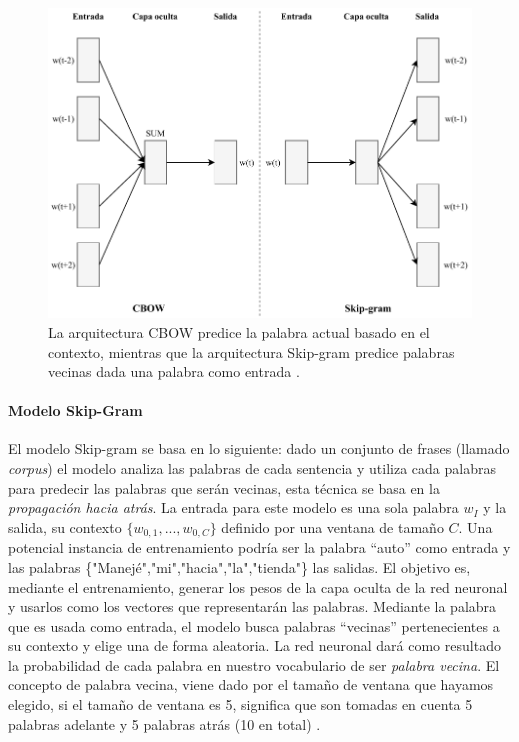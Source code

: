 \begin{figure}[h!]
	\centering
	\includegraphics[width=0.7\linewidth]{7_marco_teorico/imagenes/cbow_skipgram.pdf}
	\caption{La arquitectura CBOW predice la palabra actual basado en el contexto, mientras que la arquitectura Skip-gram predice palabras vecinas dada una palabra como entrada \citep{mikolov2013efficient}.}
	\label{fig:cbowskipgram}
\end{figure}

\paragraph{Modelo Skip-Gram}
El modelo Skip-gram se basa en lo siguiente: dado un conjunto de frases (llamado \textit{corpus}) el modelo analiza las palabras de cada sentencia y utiliza cada palabras para predecir las palabras que serán vecinas, esta técnica se basa en la \textit{propagación hacia atrás}. La entrada para este modelo es una sola palabra \(w_I\) y la salida, su contexto \(\{w_{0,1},..., w_{0,C}\}\) definido por una ventana de tamaño \(C\). Una potencial instancia de entrenamiento podría ser la palabra “auto” como entrada y las palabras \{"Manejé","mi","hacia","la","tienda"\} las salidas. El objetivo es, mediante el entrenamiento, generar los pesos de la capa oculta de la red neuronal y usarlos como los vectores que representarán las palabras. Mediante la palabra que es usada como entrada, el modelo busca palabras “vecinas” pertenecientes a su contexto y elige una de forma aleatoria. La red neuronal dará como resultado la probabilidad de cada palabra en nuestro vocabulario de ser \textit{palabra vecina}. El concepto de palabra vecina, viene dado por el tamaño de ventana que hayamos elegido, si el tamaño de ventana es 5, significa que son tomadas en cuenta 5 palabras adelante y 5 palabras atrás (10 en total) \citep{skipgrammodel}.

